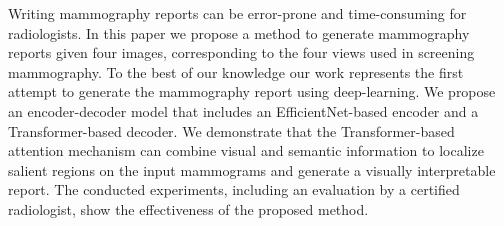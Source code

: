 Writing mammography reports can be error-prone and time-consuming for radiologists. In this paper we propose a method to generate mammography reports given four images, corresponding to the four views used in screening mammography. To the best of our knowledge our work represents the first attempt to generate the mammography report using deep-learning. We propose an encoder-decoder model that includes an EfficientNet-based encoder and a Transformer-based decoder. We demonstrate that the Transformer-based attention mechanism can combine visual and semantic information to localize salient regions on the input mammograms and generate a visually interpretable report. The conducted experiments, including an evaluation by a certified radiologist, show the effectiveness of the proposed method.
